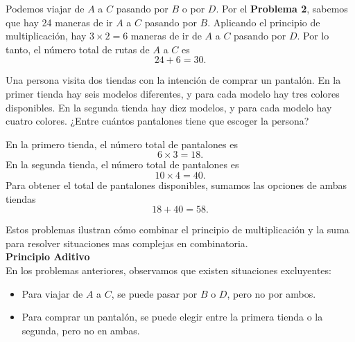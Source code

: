 \documentclass[12pt,a4paper]{book}
\begin{document}
    \begin{solucion}
        Podemos viajar de $A$ a $C$ pasando por $B$ o por $D$. Por el \textbf{Problema 2}, sabemos que hay 24 maneras de ir $A$ a $C$ pasando por $B$. Aplicando el principio de multiplicación, hay $3\times2=6$ maneras de ir de $A$ a $C$ pasando por $D$. Por lo tanto, el número total de rutas de $A$ a $C$ es
        \begin{equation*}
            24+6=30.
        \end{equation*}
    \end{solucion}

    \begin{mdframed}[style=mdgraybox,frametitle={Problema 7: Elección de pantalones en dos tiendas}]
        Una persona visita dos tiendas con la intención de comprar un pantalón. En la primer tienda hay seis modelos diferentes, y para cada modelo hay tres colores disponibles. En la segunda tienda hay diez modelos, y para cada modelo hay cuatro colores. ¿Entre cuántos pantalones tiene que escoger la persona?
    \end{mdframed}

    \begin{solucion}
        En la primero tienda, el número total de pantalones es
        \begin{equation*}
            6\times3=18.
        \end{equation*}
        En la segunda tienda, el número total de pantalones es
        \begin{equation*}
            10\times 4=40.
        \end{equation*}
        Para obtener el total de pantalones disponibles, sumamos las opciones de ambas tiendas
        \begin{equation*}
            18+40=58.
        \end{equation*}
    \end{solucion}
    
    Estos problemas ilustran cómo combinar el principio de multiplicación y la suma para resolver situaciones mas complejas en combinatoria.\\
    \textbf{Principio Aditivo}\\
    En los problemas anteriores, observamos que existen situaciones excluyentes:
    \begin{itemize}
        \item Para viajar de $A$ a $C$, se puede pasar por $B$ o $D$, pero no por ambos.
        \item Para comprar un pantalón, se puede elegir entre la primera tienda o la segunda, pero no en ambas.
    \end{itemize}
\end{document}
